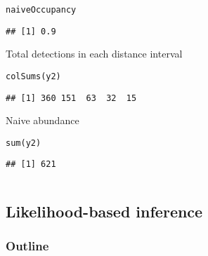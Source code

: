 \documentclass[color=usenames,dvipsnames]{beamer}\usepackage[]{graphicx}\usepackage[]{xcolor}
\makeatletter
\newcommand{\hldef}[1]{\textcolor[rgb]{0,0,0}{#1}}%
\newcommand{\hlkwd}[1]{\textcolor[rgb]{0.004,0.004,0.506}{#1}}%
\newenvironment{kframe}{%
 \def\at@end@of@kframe{}%
 \ifinner\ifhmode%
  \def\at@end@of@kframe{\end{minipage}}%
  \begin{minipage}{\columnwidth}%
 \fi\fi%
 \def\FrameCommand##1{\hskip\@totalleftmargin \hskip-\fboxsep
 \colorbox{shadecolor}{##1}\hskip-\fboxsep
     \hskip-\linewidth \hskip-\@totalleftmargin \hskip\columnwidth}%
 \MakeFramed {\advance\hsize-\width
   \@totalleftmargin\z@ \linewidth\hsize
   \@setminipage}}%
 {\par\unskip\endMakeFramed%
 \at@end@of@kframe}
\newenvironment{knitrout}{}{} %
\makeatother
\begin{document}
\begin{frame}[fragile]
\begin{columns}
\begin{column}{0.6\textwidth}
\begin{knitrout}
\begin{kframe}
\begin{alltt}
\hldef{naiveOccupancy}
\end{alltt}
\begin{verbatim}
## [1] 0.9
\end{verbatim}
\end{kframe}
\end{knitrout}
  \pause
  \vfill
  \small
  Total detections in each distance interval
  \vspace{-6pt}
\begin{knitrout}\scriptsize
{}\color{fgcolor}\begin{kframe}
\begin{alltt}
\hlkwd{colSums}\hldef{(y2)}
\end{alltt}
\begin{verbatim}
## [1] 360 151  63  32  15
\end{verbatim}
\end{kframe}
\end{knitrout}
  \pause
  \vfill
  Naive abundance
  \vspace{-6pt}
\begin{knitrout}\scriptsize
{}\color{fgcolor}\begin{kframe}
\begin{alltt}
\hlkwd{sum}\hldef{(y2)}
\end{alltt}
\begin{verbatim}
## [1] 621
\end{verbatim}
\end{kframe}
\end{knitrout}
  \end{column}
  \end{columns}
\end{frame}






\subsection{Likelihood-based inference}


\begin{frame}
  \frametitle{Outline}
  \Large
  \tableofcontents[currentsection]
\end{frame}
\end{document}
